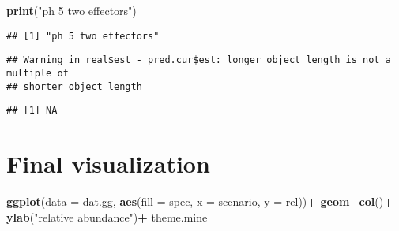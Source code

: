 \documentclass[
]{article}
\newenvironment{Shaded}{\begin{snugshade}}{\end{snugshade}}
\newcommand{\AttributeTok}[1]{\textcolor[rgb]{0.13,0.29,0.53}{#1}}
\newcommand{\DecValTok}[1]{\textcolor[rgb]{0.00,0.00,0.81}{#1}}
\newcommand{\FunctionTok}[1]{\textcolor[rgb]{0.13,0.29,0.53}{\textbf{#1}}}
\newcommand{\NormalTok}[1]{#1}
\newcommand{\OtherTok}[1]{\textcolor[rgb]{0.56,0.35,0.01}{#1}}
\newcommand{\SpecialCharTok}[1]{\textcolor[rgb]{0.81,0.36,0.00}{\textbf{#1}}}
\newcommand{\StringTok}[1]{\textcolor[rgb]{0.31,0.60,0.02}{#1}}
\begin{document}
\begin{Shaded}
\begin{Highlighting}[]
\FunctionTok{print}\NormalTok{(}\StringTok{"ph 5 two effectors"}\NormalTok{)}
\end{Highlighting}
\end{Shaded}

\begin{verbatim}
## [1] "ph 5 two effectors"
\end{verbatim}

\begin{Shaded}
\end{Shaded}

\begin{verbatim}
## Warning in real$est - pred.cur$est: longer object length is not a multiple of
## shorter object length
\end{verbatim}

\begin{verbatim}
## [1] NA
\end{verbatim}

\hypertarget{final-visualization}{%
\section{Final visualization}\label{final-visualization}}

\begin{Shaded}
\begin{Highlighting}[]
\FunctionTok{ggplot}\NormalTok{(}\AttributeTok{data =}\NormalTok{ dat.gg, }\FunctionTok{aes}\NormalTok{(}\AttributeTok{fill =}\NormalTok{ spec, }\AttributeTok{x =}\NormalTok{ scenario, }\AttributeTok{y =}\NormalTok{ rel))}\SpecialCharTok{+}
  \FunctionTok{geom\_col}\NormalTok{()}\SpecialCharTok{+}
  \FunctionTok{ylab}\NormalTok{(}\StringTok{"relative abundance"}\NormalTok{)}\SpecialCharTok{+}
\NormalTok{  theme.mine}
\end{Highlighting}
\end{Shaded}
\end{document}
